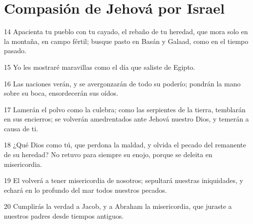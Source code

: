 \section*{Compasión de Jehová por Israel}

\par 14 Apacienta tu pueblo con tu cayado, el rebaño de tu heredad, que mora solo en la montaña, en campo fértil; busque pasto en Basán y Galaad, como en el tiempo pasado.
\par 15 Yo les mostraré maravillas como el día que saliste de Egipto.
\par 16 Las naciones verán, y se avergonzarán de todo su poderío; pondrán la mano sobre su boca, ensordecerán sus oídos.
\par 17 Lamerán el polvo como la culebra; como las serpientes de la tierra, temblarán en sus encierros; se volverán amedrentados ante Jehová nuestro Dios, y temerán a causa de ti.
\par 18 ¿Qué Dios como tú, que perdona la maldad, y olvida el pecado del remanente de su heredad? No retuvo para siempre su enojo, porque se deleita en misericordia.
\par 19 El volverá a tener misericordia de nosotros; sepultará nuestras iniquidades, y echará en lo profundo del mar todos nuestros pecados.
\par 20 Cumplirás la verdad a Jacob, y a Abraham la misericordia, que juraste a nuestros padres desde tiempos antiguos.

